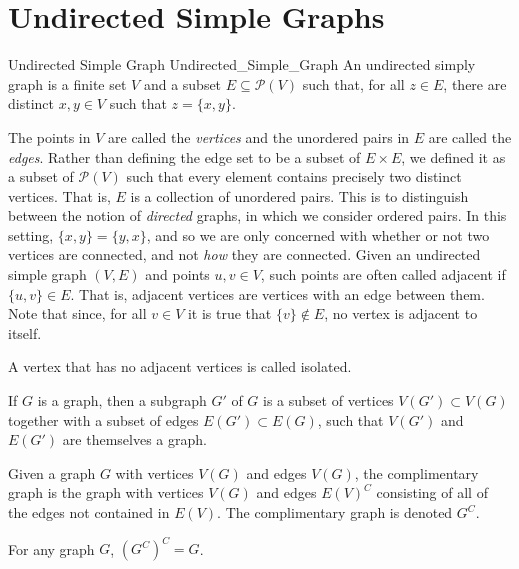 \section{Undirected Simple Graphs}
    \begin{fdefinition}{Undirected Simple Graph}
                       {Undirected_Simple_Graph}
        An undirected simply graph is a finite set $V$ and a subset
        $E\subseteq\mathcal{P}(V)$ such that, for all $z\in{E}$, there are
        distinct $x,y\in{V}$ such that $z=\{x,y\}$.
    \end{fdefinition}
    The points in $V$ are called the \textit{vertices} and the unordered
    pairs in $E$ are called the \textit{edges}. Rather than defining the
    edge set to be a subset of $E\times{E}$, we defined it as a subset of
    $\mathcal{P}(V)$ such that every element contains precisely two distinct
    vertices. That is, $E$ is a collection of unordered pairs. This is to
    distinguish between the notion of \textit{directed} graphs, in which we
    consider ordered pairs. In this setting, $\{x,y\}=\{y,x\}$, and so we
    are only concerned with whether or not two vertices are connected, and
    not \textit{how} they are connected. Given an undirected simple graph
    $(V,E)$ and points $u,v\in{V}$, such points are often called adjacent if
    $\{u,v\}\in{E}$. That is, adjacent vertices are vertices with an edge
    between them. Note that since, for all $v\in{V}$ it is true that
    $\{v\}\notin{E}$, no vertex is adjacent to itself.
    \begin{definition}
        A vertex that has no adjacent vertices is called isolated.
    \end{definition}
    \begin{definition}
        If $G$ is a graph, then a subgraph $G'$ of $G$ is a subset of
        vertices $V(G')\subset{V(G)}$ together with a subset of edges
        $E(G')\subset{E(G)}$, such that $V(G')$ and $E(G')$ are themselves
        a graph.
    \end{definition}
    \begin{definition}
        Given a graph $G$ with vertices $V(G)$ and edges $V(G)$, the
        complimentary graph is the graph with vertices $V(G)$ and edges
        $E(V)^C$ consisting of all of the edges not contained in $E(V)$. The
        complimentary graph is denoted $G^C$.
    \end{definition}
    \begin{theorem}
        For any graph $G$, $(G^C)^{C}=G$.
    \end{theorem}
